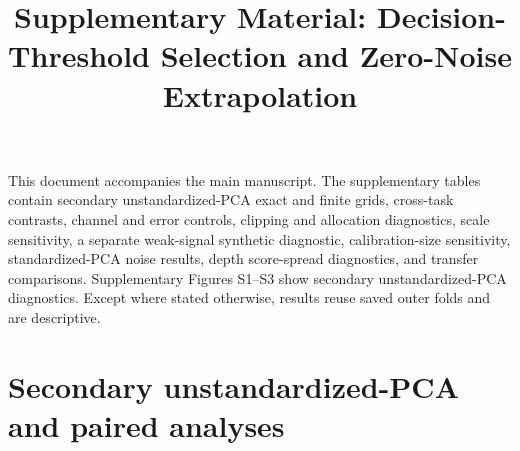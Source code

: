 \documentclass[10pt]{article}
\title{Supplementary Material: Decision-Threshold Selection and Zero-Noise Extrapolation}
\date{}
\begin{document}
\maketitle
\renewcommand{\thetable}{S\arabic{table}}
This document accompanies the main manuscript. The supplementary tables contain secondary unstandardized-PCA exact and finite grids, cross-task contrasts, channel and error controls, clipping and allocation diagnostics, scale sensitivity, a separate weak-signal synthetic diagnostic, calibration-size sensitivity, standardized-PCA noise results, depth score-spread diagnostics, and transfer comparisons. Supplementary Figures S1--S3 show secondary unstandardized-PCA diagnostics. Except where stated otherwise, results reuse saved outer folds and are descriptive.

\section*{Secondary unstandardized-PCA and paired analyses}

\begin{table}[t]
\centering
\caption{Secondary unstandardized-PCA WDBC exact-expectation results (mean across saved model runs).}
\label{tab:exact}
\scriptsize
\setlength{\tabcolsep}{2.2pt}
\end{table}
\end{document}
